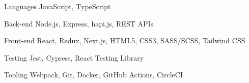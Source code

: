 
\begin{cvskills}

  \cvskill
    {Languages} %
    {JavaScript, TypeScript} %

  \cvskill
    {Back-end} %
    {Node.js, Express, hapi.js, REST APIs} %

  \cvskill
    {Front-end} %
    {React, Redux, Next.js, HTML5, CSS3, SASS/SCSS, Tailwind CSS} %

  \cvskill
    {Testing} %
    {Jest, Cypress, React Testing Library} %

  \cvskill
    {Tooling} %
    {Webpack, Git, Docker, GitHub Actions, CircleCI} %

\end{cvskills}
